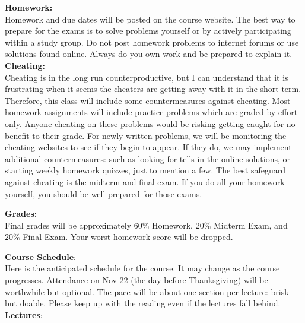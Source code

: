 \documentclass[12pt]{article}
\begin{document}
\noindent
\textbf{Homework:}\\
Homework and due dates will be posted on the course website.  The best way to prepare for the exams is to solve problems yourself or by actively participating within a study group.  Do not post homework problems to internet forums or use solutions found online.  Always do you own work and be prepared to explain it.\\

\noindent
\textbf{Cheating:}\\
Cheating is in the long run counterproductive, but I can understand that it is frustrating when it seems the cheaters are getting away with it in the short term.  Therefore, this class will include some countermeasures against cheating.  Most homework assignments will include practice problems which are graded by effort only.  Anyone cheating on these problems would be risking getting caught for no benefit to their grade.  For newly written problems, we will be monitoring the cheating websites to see if they begin to appear.  If they do, we may implement additional countermeasures: such as looking for tells in the online solutions, or starting weekly homework quizzes, just to mention a few.
The best safeguard against cheating is the midterm and final exam.  If you do all your homework yourself, you should be well prepared for those exams.

\noindent
\textbf {Grades:}\\
Final grades will be approximately $60\%$ Homework, $20\%$ Midterm Exam, and
$20\%$ Final Exam.  Your worst homework score will be dropped.\\
\noindent

\noindent
\textbf {Course Schedule}:\\
Here is the anticipated schedule for the course.  It may change as the
course progresses.  Attendance on Nov 22 (the day before Thanksgiving) will be worthwhile but optional.
The pace will be about one section per lecture: brisk but doable.  Please keep up with the reading even if the lectures fall behind.\\

\noindent
\textbf {Lectures}:\\
\end{document}
